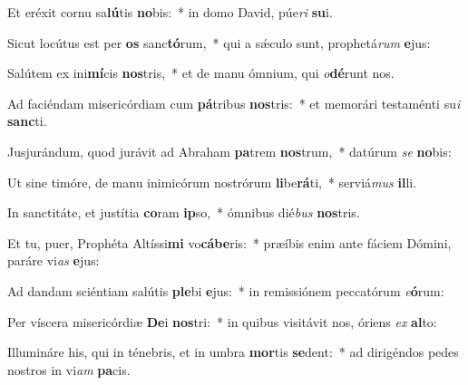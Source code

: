\item Et eréxit cornu sa\textbf{lú}tis \textbf{no}bis:~* in domo David, púe\textit{ri} \textbf{su}i.
\item Sicut locútus est per \textbf{os} sanc\textbf{tó}rum,~* qui a sǽculo sunt, prophetá\textit{rum} \textbf{e}jus:
\item Salútem ex ini\textbf{mí}cis \textbf{nos}tris,~* et de manu ómnium, qui \textit{o}\textbf{dé}runt nos.
\item Ad faciéndam misericórdiam cum \textbf{pá}tribus \textbf{nos}tris:~* et memorári testaménti su\textit{i} \textbf{sanc}ti.
\item Jusjurándum, quod jurávit ad Abraham \textbf{pa}trem \textbf{nos}trum,~* datúrum \textit{se} \textbf{no}bis:
\item Ut sine timóre, de manu inimicórum nostrórum \textbf{li}be\textbf{rá}ti,~* serviá\textit{mus} \textbf{il}li.
\item In sanctitáte, et justítia \textbf{co}ram \textbf{ip}so,~* ómnibus dié\textit{bus} \textbf{nos}tris.
\item Et tu, puer, Prophéta Altíssi\textbf{mi} vo\textbf{cá}\textbf{be}ris:~* præíbis enim ante fáciem Dómini, paráre vi\textit{as} \textbf{e}jus:
\item Ad dandam sciéntiam salútis \textbf{ple}bi \textbf{e}jus:~* in remissiónem peccatórum \textit{e}\textbf{ó}rum:
\item Per víscera misericórdiæ \textbf{De}i \textbf{nos}tri:~* in quibus visitávit nos, óriens \textit{ex} \textbf{al}to:
\item Illumináre his, qui in ténebris, et in umbra \textbf{mor}tis \textbf{se}dent:~* ad dirigéndos pedes nostros in vi\textit{am} \textbf{pa}cis.
